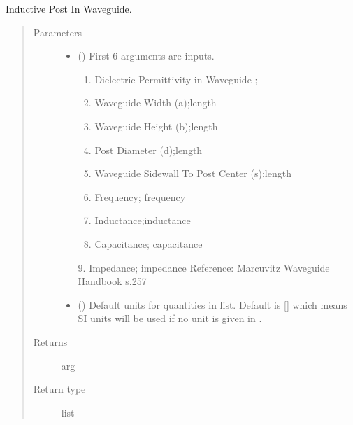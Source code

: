\documentclass[letterpaper,10pt,english]{sphinxmanual}
\begin{document}
\begin{fulllineitems}
\label{\detokenize{components:components.InductivePostInWaveguide}}
Inductive Post In Waveguide.
\begin{quote}\begin{description}
\item[{Parameters}] \leavevmode\begin{itemize}
\item {} 
 () \textendash{} 
First 6 arguments are inputs.
\begin{enumerate}
%
\item {} 
Dielectric Permittivity in Waveguide ;

\item {} 
Waveguide Width (a);length

\item {} 
Waveguide Height (b);length

\item {} 
Post Diameter (d);length

\item {} 
Waveguide Sidewall To Post Center (s);length

\item {} 
Frequency; frequency

\item {} 
Inductance;inductance

\item {} 
Capacitance; capacitance

\end{enumerate}

9. Impedance; impedance
Reference:  Marcuvitz Waveguide Handbook s.257


\item {} 
 (\sphinxstyleliteralemphasis{\sphinxupquote{, }}) \textendash{} Default units for quantities in  list. Default is {[}{]} which means SI units will be used if no unit is given in .

\end{itemize}

\item[{Returns}] \leavevmode
arg

\item[{Return type}] \leavevmode
list

\end{description}\end{quote}

\end{fulllineitems}
\end{document}
